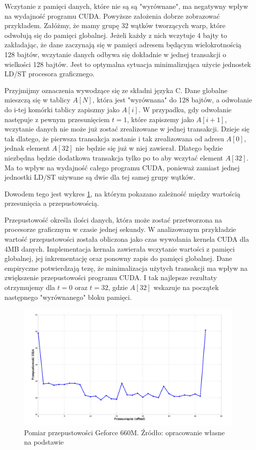 Wczytanie z pamięci danych, które nie są są "wyrównane", ma negatywny wpływ na
wydajność programu CUDA.  Powyższe założenia dobrze zobrazować przykładem.
Załóżmy, że mamy grupę 32 wątków tworzących warp, które odwołują się do pamięci
globalnej. Jeżeli każdy z nich wczytuje 4 bajty to zakładając, że dane
zaczynają się w pamięci adresem będącym wielokrotnością 128 bajtów, wczytanie
danych odbywa się dokładnie w jednej transakcji o wielkości 128 bajtów. Jest to
optymalna sytuacja minimalizująca użycie jednostek LD/ST procesora graficznego.

Przyjmijmy oznaczenia wywodzące się ze składni języka C. Dane globalne mieszczą się w
tablicy $A[N]$, która jest "wyrównana" do 128 bajtów, a odwołanie do
i-tej komórki tablicy zapiszmy jako $A[i]$. W przypadku, gdy odwołanie następuje
z pewnym przesunięciem $t = 1$, które zapiszemy jako $A[i + 1]$, wczytanie danych
nie może już zostać zrealizowane w jednej transakcji. Dzieje się tak dlatego, że
pierwsza transakcja zostanie i tak zrealizowana od adresu $A[0]$, jednak element
$A[32]$ nie będzie się już w niej zawierał. Dlatego będzie niezbędna będzie
dodatkowa transakcja tylko po to aby wczytać element $A[32]$. Ma to wpływ na
wydajność całego programu CUDA, ponieważ zamiast jednej jednostki LD/ST używane
są dwie dla tej samej grupy wątków. 

Dowodem tego jest wykres \ref{hier2}, na którym pokazano
zależność między wartością przesunięcia a przepustowością.

Przepustowość określa ilości danych, która może zostać przetworzona na
procesorze graficznym w czasie jednej sekundy. W analizowanym przykładzie
wartość przepustowości została obliczona jako czas wywołania kernela CUDA dla
4MB danych. Implementacja kernala zawierała wczytanie wartości z pamięci
globalnej, jej inkrementację oraz ponowny zapis do pamięci globalnej. Dane
empiryczne potwierdzają tezę, że minimalizacja użytych transakcji ma wpływ na
zwiększenie przepustowości programu CUDA. I tak najlepsze rezultaty otrzymujemy
dla $t = 0$ oraz $t = 32$, gdzie $A[32]$ wskazuje na początek następnego
"wyrównanego" bloku pamięci.

\begin{figure}[H]
\centering
\includegraphics[scale=0.4]{images/gf660_offset.png}
\caption{Pomiar przepustowości Geforce 660M. Źródło: opracowanie własne na
	podstawie \cite{memperf}}
\label{hier2}
\end{figure}


